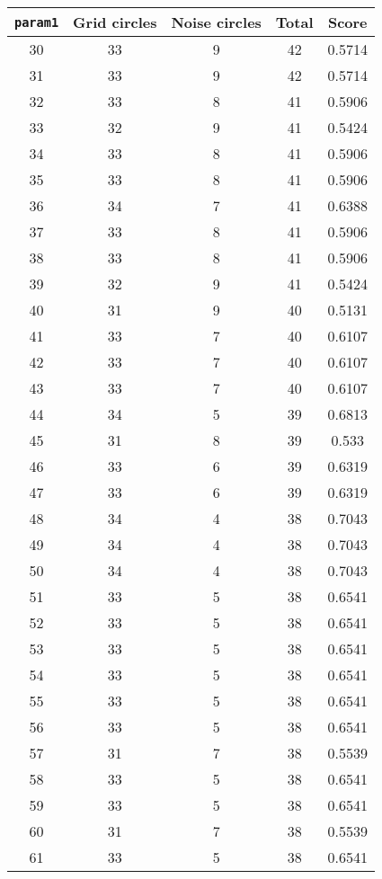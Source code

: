\documentclass[letterpaper, 12pt]{article}
\begin{document}
\begin{longtable}{|c|c|c|c|c|}
\hline
\textbf{\texttt{param1}} & \textbf{Grid circles} & \textbf{Noise circles} & \textbf{Total} & \textbf{Score} \\
\hline
30 & 33 & 9 & 42 & 0.5714 \\
\hline
31 & 33 & 9 & 42 & 0.5714 \\
\hline
32 & 33 & 8 & 41 & 0.5906 \\
\hline
33 & 32 & 9 & 41 & 0.5424 \\
\hline
34 & 33 & 8 & 41 & 0.5906 \\
\hline
35 & 33 & 8 & 41 & 0.5906 \\
\hline
36 & 34 & 7 & 41 & 0.6388 \\
\hline
37 & 33 & 8 & 41 & 0.5906 \\
\hline
38 & 33 & 8 & 41 & 0.5906 \\
\hline
39 & 32 & 9 & 41 & 0.5424 \\
\hline
40 & 31 & 9 & 40 & 0.5131 \\
\hline
41 & 33 & 7 & 40 & 0.6107 \\
\hline
42 & 33 & 7 & 40 & 0.6107 \\
\hline
43 & 33 & 7 & 40 & 0.6107 \\
\hline
44 & 34 & 5 & 39 & 0.6813 \\
\hline
45 & 31 & 8 & 39 & 0.533 \\
\hline
46 & 33 & 6 & 39 & 0.6319 \\
\hline
47 & 33 & 6 & 39 & 0.6319 \\
\hline
48 & 34 & 4 & 38 & 0.7043 \\
\hline
49 & 34 & 4 & 38 & 0.7043 \\
\hline
50 & 34 & 4 & 38 & 0.7043 \\
\hline
51 & 33 & 5 & 38 & 0.6541 \\
\hline
52 & 33 & 5 & 38 & 0.6541 \\
\hline
53 & 33 & 5 & 38 & 0.6541 \\
\hline
54 & 33 & 5 & 38 & 0.6541 \\
\hline
55 & 33 & 5 & 38 & 0.6541 \\
\hline
56 & 33 & 5 & 38 & 0.6541 \\
\hline
57 & 31 & 7 & 38 & 0.5539 \\
\hline
58 & 33 & 5 & 38 & 0.6541 \\
\hline
59 & 33 & 5 & 38 & 0.6541 \\
\hline
60 & 31 & 7 & 38 & 0.5539 \\
\hline
61 & 33 & 5 & 38 & 0.6541 \\

\end{longtable}
\end{document}
